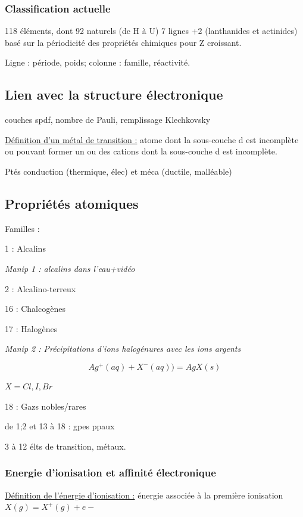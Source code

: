 \documentclass{article}%
\begin{document}
\subsubsection{Classification actuelle}

118 éléments, dont 92 naturels (de H à U) 7 lignes +2 (lanthanides et actinides) basé sur la périodicité des propriétés chimiques pour Z croissant.

Ligne : période, poids; colonne : famille,  réactivité.

\subsection{Lien avec la structure électronique}

couches spdf, nombre de Pauli, remplissage Klechkovsky

\underline{Définition d'un métal de transition :} atome dont la sous-couche d est incomplète ou pouvant former un ou des cations dont la sous-couche d est incomplète.

Ptés conduction (thermique, élec) et méca (ductile, malléable)

\subsection{Propriétés atomiques}

Familles :

1 : Alcalins

\textit{Manip 1 : alcalins dans l'eau+vidéo}

2 : Alcalino-terreux

16 : Chalcogènes

17 : Halogènes

\textit{Manip 2 : Précipitations d'ions halogénures avec les ions argents}

\[Ag^+(aq) + X^-(aq)) = AgX(s)\]

$X= Cl, I, Br$

18 : Gazs nobles/rares

de 1;2 et 13 à 18 : gpes ppaux

3 à 12 élts de transition, métaux.

\subsubsection{Energie d'ionisation et affinité électronique}

\underline{Définition de l'énergie d'ionisation :} énergie associée à la première ionisation $X(g)=X^+(g)+e-$
\end{document}
